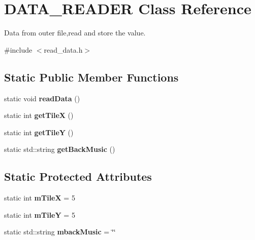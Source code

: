 \hypertarget{class_d_a_t_a___r_e_a_d_e_r}{\section{D\-A\-T\-A\-\_\-\-R\-E\-A\-D\-E\-R Class Reference}
\label{class_d_a_t_a___r_e_a_d_e_r}
}


Data from outer file,read and store the value.  




{\ttfamily \#include $<$read\-\_\-data.\-h$>$}

\subsection*{Static Public Member Functions}
\begin{DoxyCompactItemize}
\item 
\hypertarget{class_d_a_t_a___r_e_a_d_e_r_a385083f4162710185c7c58425d9d9805}{static void {\bfseries read\-Data} ()}\label{class_d_a_t_a___r_e_a_d_e_r_a385083f4162710185c7c58425d9d9805}

\item 
\hypertarget{class_d_a_t_a___r_e_a_d_e_r_ae622595e5d5d4afef507b99481b4b1dd}{static int {\bfseries get\-Tile\-X} ()}\label{class_d_a_t_a___r_e_a_d_e_r_ae622595e5d5d4afef507b99481b4b1dd}

\item 
\hypertarget{class_d_a_t_a___r_e_a_d_e_r_aa260b6f0016c268d63a57bb5d15c41bf}{static int {\bfseries get\-Tile\-Y} ()}\label{class_d_a_t_a___r_e_a_d_e_r_aa260b6f0016c268d63a57bb5d15c41bf}

\item 
\hypertarget{class_d_a_t_a___r_e_a_d_e_r_a2f0171b1165484f1aeade8c7f87f16ff}{static std\-::string {\bfseries get\-Back\-Music} ()}\label{class_d_a_t_a___r_e_a_d_e_r_a2f0171b1165484f1aeade8c7f87f16ff}

\end{DoxyCompactItemize}
\subsection*{Static Protected Attributes}
\begin{DoxyCompactItemize}
\item 
\hypertarget{class_d_a_t_a___r_e_a_d_e_r_ad29377b4f107485f212adf6a91fc1309}{static int {\bfseries m\-Tile\-X} = 5}\label{class_d_a_t_a___r_e_a_d_e_r_ad29377b4f107485f212adf6a91fc1309}

\item 
\hypertarget{class_d_a_t_a___r_e_a_d_e_r_a3e3642a217263d3c4ae86abd489b8a06}{static int {\bfseries m\-Tile\-Y} = 5}\label{class_d_a_t_a___r_e_a_d_e_r_a3e3642a217263d3c4ae86abd489b8a06}

\item 
\hypertarget{class_d_a_t_a___r_e_a_d_e_r_ae4db6169d844fc33d6815119a4ba79c8}{static std\-::string {\bfseries mback\-Music} = \char`\"{}\char`\"{}}\label{class_d_a_t_a___r_e_a_d_e_r_ae4db6169d844fc33d6815119a4ba79c8}

\end{DoxyCompactItemize}


